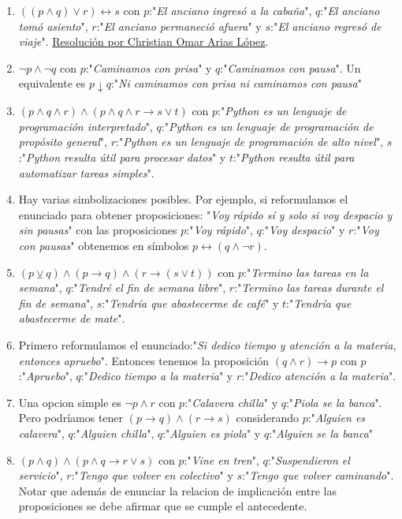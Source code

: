 \documentclass[a4paper]{article}
\newcommand{\then}{\to}
\newcommand{\eq}{\leftrightarrow}
\newcommand{\xor}{\veebar}
\begin{document}
\begin{enumerate}
\begin{enumerate} [label=(\alph*)]
		\item $((p \land q) \lor r) \eq s$ con $p$:"\textit{El anciano ingresó a la cabaña}", $q$:"\textit{El anciano tomó asiento}", $r$:"\textit{El anciano permaneció afuera}" y $s$:"\textit{El anciano regresó de viaje}". \href{https://youtu.be/TgwraosKUuY?t=331}{Resolución por Christian Omar Arias López}.
		\item $\neg p  \land  \neg q$ con $p$:"\textit{Caminamos con prisa}" y $q$:"\textit{Caminamos con pausa}". Un equivalente es $p \downarrow  q$:"\textit{Ni caminamos con prisa ni caminamos con pausa}"
		\item $( p  \land  q  \land  r ) \land ( p  \land  q  \land  r  \then   s \lor  t )$ con $p$:"\textit{Python es un lenguaje de programación interpretado}", $q$:"\textit{Python es un lenguaje de programación  de propósito general}", $r$:"\textit{Python es un lenguaje de programación de alto nivel}", $s$:"\textit{Python resulta útil para procesar datos}" y $t$:"\textit{Python resulta útil para automatizar tareas simples}".
		\item Hay varias simbolizaciones posibles. Por ejemplo, si reformulamos el enunciado para obtener proposiciones: "\textit{Voy rápido sí y solo si voy despacio y sin pausas}" con las proposiciones $p$:"\textit{Voy rápido}", $q$:"\textit{Voy despacio}" y $r$:"\textit{Voy con pausas}" obtenemos en símbolos $p \eq ( q \land \neg r)$.
		\item $(p \xor q) \land ( p \then  q ) \land  ( r \then  ( s \lor  t) )$ con $p$:"\textit{Termino las tareas en la semana}", $q$:"\textit{Tendré el fin de semana libre}", $r$:"\textit{Termino las tareas durante el fin de semana}", $s$:"\textit{Tendría que abastecerme de café}" y $t$:"\textit{Tendría que abastecerme de mate}".
		\item Primero reformulamos el enunciado:"\textit{Si dedico tiempo y atención a la materia, entonces apruebo}". Entonces tenemos la proposición $( q  \land  r ) \then  p$ con $p$:"\textit{Apruebo}", $q$:"\textit{Dedico tiempo a la materia}" y $r$:"\textit{Dedico atención a la materia}".
		\item Una opcion simple es $\neg p  \land  r$ con $p$:"\textit{Calavera chilla}" y $q$:"\textit{Piola se la banca}". Pero podríamos tener $( p\then q )  \land  ( r\then s )$ considerando $p$:"\textit{Alguien es calavera}", $q$:"\textit{Alguien chilla}", $q$:"\textit{Alguien es piola}" y $q$:"\textit{Alguien se la banca}"
		\item $( p  \land  q ) \land ( p  \land  q  \then  r \lor  s )$ con $p$:"\textit{Vine en tren}", $q$:"\textit{Suspendieron el servicio}", $r$:"\textit{Tengo que volver en colectivo}" y $s$:"\textit{Tengo que volver caminando}". Notar que además de enunciar la relacion de implicación entre las proposiciones se debe afirmar que se cumple el antecedente.

\end{enumerate}
\end{enumerate}
\end{document}
